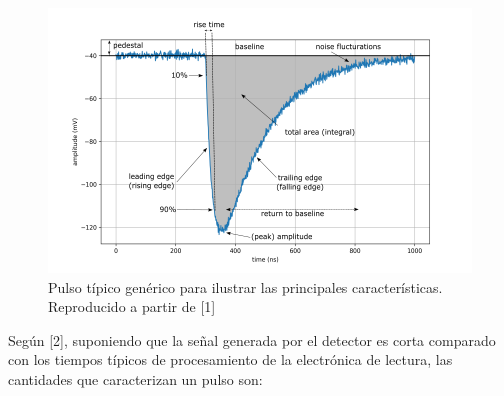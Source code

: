 \documentclass[]{book}
\begin{document}
\begin{figure}[h]
    \centering
    \includegraphics[width=1.0\textwidth]{pulse_edited.png}
    \caption{Pulso típico genérico para ilustrar las principales características. Reproducido a partir de [1]}
    \label{fig:pulse}

\end{figure}

\noindent Según [2], suponiendo que la señal generada por el detector es corta comparado con los tiempos típicos de procesamiento de la electrónica de lectura, las cantidades que caracterizan un pulso son:
\end{document}
